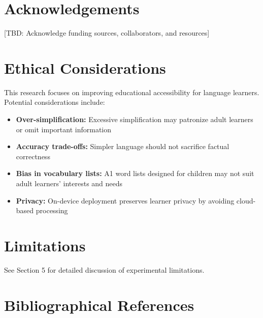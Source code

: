\documentclass[10pt, a4paper]{article}
\begin{document}
\section{Acknowledgements}

[TBD: Acknowledge funding sources, collaborators, and resources]

\section{Ethical Considerations}

This research focuses on improving educational accessibility for language learners. Potential considerations include:

\begin{itemize}
\item \textbf{Over-simplification:} Excessive simplification may patronize adult learners or omit important information
\item \textbf{Accuracy trade-offs:} Simpler language should not sacrifice factual correctness
\item \textbf{Bias in vocabulary lists:} A1 word lists designed for children may not suit adult learners' interests and needs
\item \textbf{Privacy:} On-device deployment preserves learner privacy by avoiding cloud-based processing
\end{itemize}

\section{Limitations}

See Section 5 for detailed discussion of experimental limitations.

\section{Bibliographical References}\label{sec:reference}
\end{document}
